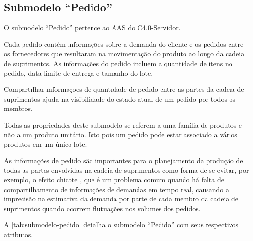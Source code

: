 \subsection{Submodelo ``Pedido''}

O submodelo ``Pedido'' pertence ao AAS do C4.0-Servidor.

Cada pedido contém informações sobre a demanda do cliente e os pedidos entre os fornecedores que resultaram na movimentação do produto ao longo da cadeia de suprimentos. As informações do pedido incluem a quantidade de itens no pedido, data limite de entrega e tamanho do lote.

Compartilhar informações de quantidade de pedido entre as partes da cadeia de suprimentos ajuda na visibilidade do estado atual de um pedido por todos os membros.

Todas as propriedades deste submodelo se referem a uma família de produtos e não a um produto unitário. Isto pois um pedido pode estar associado a vários produtos em um único lote.

As informações de pedido são importantes para o planejamento da produção de todas as partes envolvidas na cadeia de suprimentos como forma de se evitar, por exemplo, o efeito chicote \cite{lee1997bullwhip}, que é um problema comum quando há falta de compartilhamento de informações de demandas em tempo real, causando a imprecisão na estimativa da demanda por parte de cada membro da cadeia de suprimentos quando ocorrem flutuações nos volumes dos pedidos.

A \autoref{tab:submodelo-pedido} detalha o submodelo ``Pedido'' com seus respectivos atributos.

